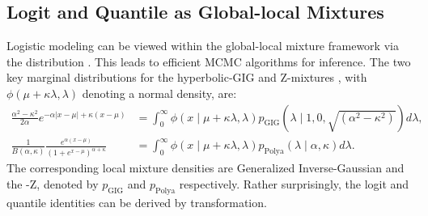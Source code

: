 \documentclass[lineno]{biometrika}
\begin{document}
\subsection{Logit and Quantile as Global-local Mixtures}
Logistic modeling can be viewed within the global-local mixture framework via the \PG distribution \citep{polson2013bayesian}. This leads to efficient MCMC algorithms for inference. The two key marginal distributions for the hyperbolic-GIG and Z-\Polya mixtures \citep{polson2013bayesian,barndorff1982normal}, with $\phi(\mu + \kappa \lambda, \lambda)$ denoting a normal density, are:
\begin{align}
\frac{\alpha^2-\kappa^2}{2\alpha} e^{-\alpha|x-\mu| + \kappa(x-\mu)} & = \int_0^{\infty} \phi(x \mid \mu + \kappa \lambda, \lambda) p_{\mathrm{GIG}}(\lambda \mid 1,0,\sqrt{(\alpha^2-\kappa^2)}) d\lambda, \label{eq:GIG}\\
\frac{1}{B(\alpha,\kappa)} \frac{e^{\alpha(x-\mu)}}{(1+e^{x-\mu})^{\alpha + \kappa}} & = \int_0^{\infty} \phi( x \mid \mu + \kappa \lambda, \lambda) p_{\mathrm{Polya}}(\lambda \mid \alpha,\kappa)  d\lambda. \label{eq:polya}
\end{align}
The corresponding local mixture densities are Generalized Inverse-Gaussian and the \Polya-Z, denoted by $p_{\mathrm{GIG}}$ and $p_{\mathrm{Polya}}$ respectively. Rather surprisingly, the logit and quantile identities can be derived by \CS transformation. 
\end{document}
